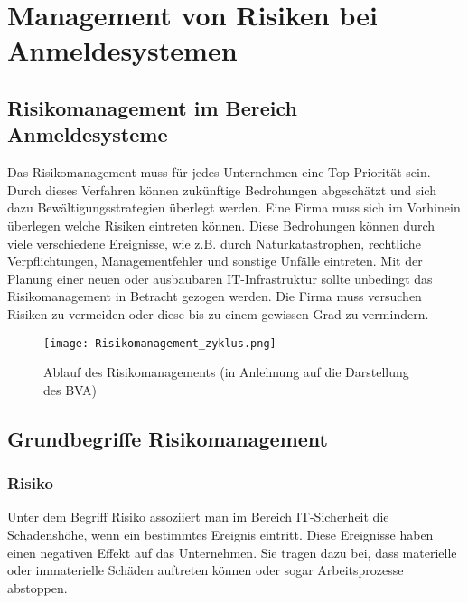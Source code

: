 \chapter{Management von Risiken bei Anmeldesystemen}
\strahlhofer

\section{Risikomanagement im Bereich Anmeldesysteme}
Das Risikomanagement muss für jedes Unternehmen eine Top-Priorität sein. Durch dieses Verfahren können zukünftige Bedrohungen abgeschätzt und sich dazu Bewältigungsstrategien überlegt werden. Eine Firma muss sich im Vorhinein überlegen welche Risiken eintreten können. Diese Bedrohungen können durch viele verschiedene Ereignisse, wie z.B. durch Naturkatastrophen, rechtliche Verpflichtungen, Managementfehler und sonstige Unfälle eintreten.
Mit der Planung einer neuen oder ausbaubaren IT-Infrastruktur sollte unbedingt das Risikomanagement in Betracht gezogen werden. Die Firma muss versuchen Risiken zu vermeiden oder diese bis zu einem gewissen Grad zu vermindern. 

\begin{center}
\begin{figure}[h]
    \centering
    \texttt{[image: Risikomanagement\_zyklus.png]}
    \caption{Ablauf des Risikomanagements (in Anlehnung auf die Darstellung des BVA)}
\end{figure}
\end{center}


\section{Grundbegriffe Risikomanagement}
\subsection{Risiko}
Unter dem Begriff Risiko assoziiert man im Bereich IT-Sicherheit die Schadenshöhe, wenn ein bestimmtes Ereignis eintritt. Diese Ereignisse haben einen negativen Effekt auf das Unternehmen. Sie tragen dazu bei, dass materielle oder immaterielle Schäden auftreten können oder sogar Arbeitsprozesse abstoppen.


